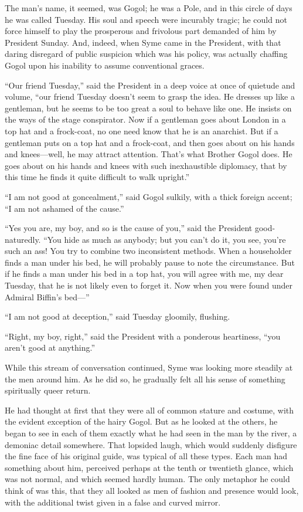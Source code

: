 The man’s name, it seemed, was Gogol; he was a Pole, and in this circle of days he was called Tuesday. His soul and speech were incurably tragic; he could not force himself to play the prosperous and frivolous part demanded of him by President Sunday. And, indeed, when Syme came in the President, with that daring disregard of public suspicion which was his policy, was actually chaffing Gogol upon his inability to assume conventional graces.

“Our friend Tuesday,” said the President in a deep voice at once of quietude and volume, “our friend Tuesday doesn’t seem to grasp the idea. He dresses up like a gentleman, but he seems to be too great a soul to behave like one. He insists on the ways of the stage conspirator. Now if a gentleman goes about London in a top hat and a frock-coat, no one need know that he is an anarchist. But if a gentleman puts on a top hat and a frock-coat, and then goes about on his hands and knees⁠—well, he may attract attention. That’s what Brother Gogol does. He goes about on his hands and knees with such inexhaustible diplomacy, that by this time he finds it quite difficult to walk upright.”

“I am not good at goncealment,” said Gogol sulkily, with a thick foreign accent; “I am not ashamed of the cause.”

“Yes you are, my boy, and so is the cause of you,” said the President good-naturedly. “You hide as much as anybody; but you can’t do it, you see, you’re such an ass! You try to combine two inconsistent methods. When a householder finds a man under his bed, he will probably pause to note the circumstance. But if he finds a man under his bed in a top hat, you will agree with me, my dear Tuesday, that he is not likely even to forget it. Now when you were found under Admiral Biffin’s bed⁠—”

“I am not good at deception,” said Tuesday gloomily, flushing.

“Right, my boy, right,” said the President with a ponderous heartiness, “you aren’t good at anything.”

While this stream of conversation continued, Syme was looking more steadily at the men around him. As he did so, he gradually felt all his sense of something spiritually queer return.

He had thought at first that they were all of common stature and costume, with the evident exception of the hairy Gogol. But as he looked at the others, he began to see in each of them exactly what he had seen in the man by the river, a demoniac detail somewhere. That lopsided laugh, which would suddenly disfigure the fine face of his original guide, was typical of all these types. Each man had something about him, perceived perhaps at the tenth or twentieth glance, which was not normal, and which seemed hardly human. The only metaphor he could think of was this, that they all looked as men of fashion and presence would look, with the additional twist given in a false and curved mirror.

